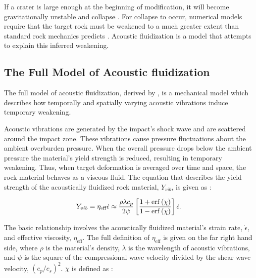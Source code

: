 If a crater is large enough at the beginning of modification, it will become gravitationally unstable and collapse \citetext{e.g., \citet{melosh1999impact}}. For collapse to occur, numerical models require that the target rock must be weakened to a much greater extent than standard rock mechanics predicts \citep{mckinnon1978investigation}. Acoustic fluidization \citep{melosh1979acoustic} is a model that attempts to explain this inferred weakening.

\subsection{The Full Model of Acoustic fluidization \label{sec:acfl}}

The full model of acoustic fluidization, derived by \citet{melosh1979acoustic}, is a mechanical model which describes how temporally and spatially varying acoustic vibrations induce temporary weakening.

Acoustic vibrations are generated by the impact's shock wave and are scattered around the impact zone. These vibrations cause pressure fluctuations about the ambient overburden pressure. When the overall pressure drops below the ambient pressure the material's yield strength is reduced, resulting in temporary weakening. Thus, when target deformation is averaged over time and space, the rock material behaves as a viscous fluid. The equation that describes the yield strength of the acoustically fluidized rock material, $Y_{vib}$, is given as \citep{collins2003acoustic}:

\vspace{-0.1cm}
\begin{equation} \label{eq:yield_vib}
Y_{vib} = \eta_{\text{eff}} \dot{\epsilon} \approx  \frac{\rho \lambda c_{p}}{2 \psi} \left[ \frac{1+\erf\left(\chi\right)}{1-\erf\left(\chi\right)} \right] \dot{\epsilon}.\vspace{0.2cm}
\end{equation} 

The basic relationship involves the acoustically fluidized material's strain rate, $\dot{\epsilon}$, and effective viscosity, $\eta_{\text{eff}}$. The full definition of $\eta_{\text{eff}}$ is given on the far right hand side, where $\rho$ is the material's density, $\lambda$ is the wavelength of acoustic vibrations, and $\psi$ is the square of the compressional wave velocity divided by the shear wave velocity, $(c_{p}/c_{s})^{2}$. $\chi$ is defined as \citep{collins2002numerical}: 


